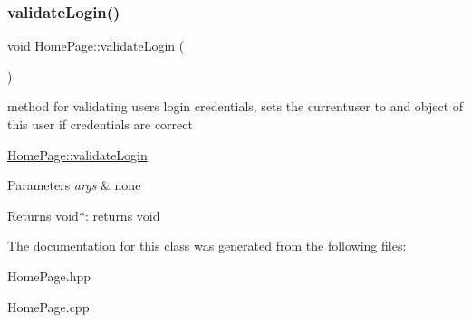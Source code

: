 \subsubsection{\texorpdfstring{validate\+Login()}{validateLogin()}}
{\footnotesize\ttfamily void Home\+Page\+::validate\+Login (\begin{DoxyParamCaption}{ }\end{DoxyParamCaption})\hspace{0.3cm}{\ttfamily [private]}}



method for validating user\textquotesingle{}s login credentials, sets the currentuser to and object of this user if credentials are correct 

\hyperlink{class_home_page_af34743abfb066e71ef7b1d2f507415eb}{Home\+Page\+::validate\+Login} 
\begin{DoxyParams}{Parameters}
{\em args} & none \\
\hline
\end{DoxyParams}
\begin{DoxyReturn}{Returns}
void$\ast$\+: returns void 
\end{DoxyReturn}


The documentation for this class was generated from the following files\+:\begin{DoxyCompactItemize}
\item 
Home\+Page.\+hpp\item 
Home\+Page.\+cpp\end{DoxyCompactItemize}
